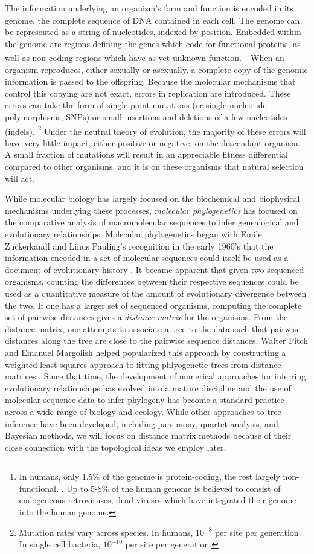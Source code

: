 The information underlying an organism's form and function is encoded in its genome, the complete sequence of DNA contained in each cell.
The genome can be represented as a string of nucleotides, indexed by position.
Embedded within the genome are regions defining the genes which code for functional proteins, as well as non-coding regions which have as-yet unknown function.
\footnote{In humans, only 1.5\% of the genome is protein-coding, the rest largely non-functional. \cite{Lander:2001hk}. Up to 5-8\% of the human genome is believed to consist of endogeneous retroviruses, dead viruses which have integrated their genome into the human genome.}
When an organism reproduces, either sexually or asexually, a complete copy of the genomic information is passed to the offspring.
Because the molecular mechanisms that control this copying are not exact, errors in replication are introduced.
These errors can take the form of single point mutations (or single nucleotide polymorphisms, SNPs) or small insertions and deletions of a few nucleotides (indels).
\footnote{Mutation rates vary across species. In humans, $10^{-8}$ per site per generation. In single cell bacteria, $10^{-10}$ per site per generation.}
Under the neutral theory of evolution, the majority of these errors will have very little impact, either positive or negative, on the descendant organism.
A small fraction of mutations will result in an appreciable fitness differential compared to other organisms, and it is on these organisms that natural selection will act.

While molecular biology has largely focused on the biochemical and biophysical mechanisms underlying these processes, \emph{molecular phylogenetics} has focused on the comparative analysis of macromolecular sequences to infer genealogical and evolutionary relationships.
Molecular phylogenetics began with Emile Zuckerkandl and Linus Pauling's recognition in the early 1960's that the information encoded in a set of molecular sequences could itself be used as a document of evolutionary history \cite{Zuckerkandl:1962,Zuckerkandl:1965wi}.
It became apparent that given two sequenced organisms, counting the differences between their respective sequences could be used as a quantitative measure of the amount of evolutionary divergence between the two.
If one has a larger set of sequenced organisms, computing the complete set of pairwise distances gives a \emph{distance matrix} for the organisms.
From the distance matrix, one attempts to associate a tree to the data such that pairwise distances along the tree are close to the pairwise sequence distances.
Walter Fitch and Emanuel Margolish helped popularized this approach by constructing a weighted least squares approach to fitting phlyogenetic trees from distance matrices \cite{Fitch:1967we}.
Since that time, the development of numerical approaches for inferring evolutionary relationships has evolved into a mature discipline and the use of molecular sequence data to infer phylogeny has become a standard practice across a wide range of biology and ecology.
While other approaches to tree inference have been developed, including parsimony, quartet analysis, and Bayesian methods, we will focus on distance matrix methods because of their close connection with the topological ideas we employ later.

